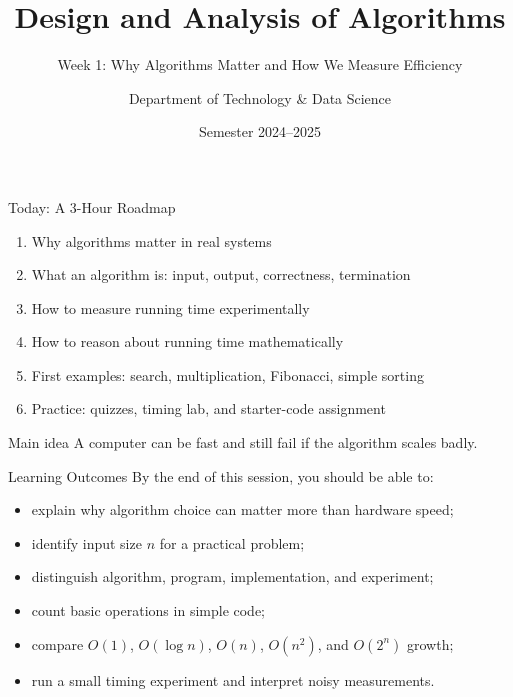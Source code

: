 \documentclass[aspectratio=169,xcolor=dvipsnames]{beamer}
\title[Algorithms -- Week 1]{Design and Analysis of Algorithms}
\subtitle{Week 1: Why Algorithms Matter and How We Measure Efficiency}
\author{Department of Technology \& Data Science}
\institute{Foreign Trade University}
\date{Semester 2024--2025}
\begin{document}
\begin{frame}
  \titlepage
\end{frame}

\begin{frame}{Today: A 3-Hour Roadmap}
  \begin{enumerate}
    \item Why algorithms matter in real systems
    \item What an algorithm is: input, output, correctness, termination
    \item How to measure running time experimentally
    \item How to reason about running time mathematically
    \item First examples: search, multiplication, Fibonacci, simple sorting
    \item Practice: quizzes, timing lab, and starter-code assignment
  \end{enumerate}
  \vspace{0.6em}
  \begin{block}{Main idea}
    A computer can be fast and still fail if the algorithm scales badly.
  \end{block}
\end{frame}

\begin{frame}{Learning Outcomes}
  By the end of this session, you should be able to:
  \begin{itemize}
    \item explain why algorithm choice can matter more than hardware speed;
    \item identify input size $n$ for a practical problem;
    \item distinguish algorithm, program, implementation, and experiment;
    \item count basic operations in simple code;
    \item compare $O(1)$, $O(\log n)$, $O(n)$, $O(n^2)$, and $O(2^n)$ growth;
    \item run a small timing experiment and interpret noisy measurements.
  \end{itemize}
\end{frame}
\end{document}
